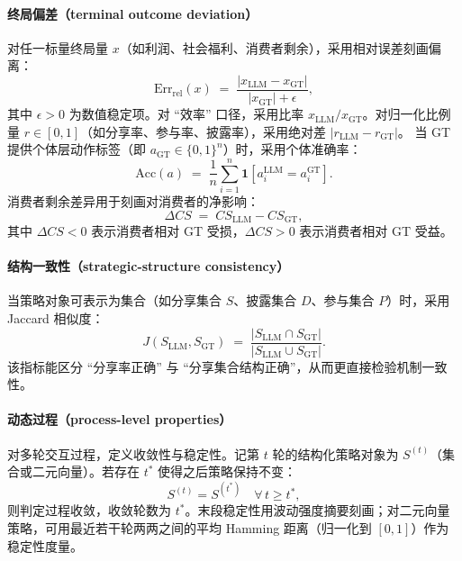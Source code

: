 \paragraph{终局偏差（terminal outcome deviation）}
对任一标量终局量 $x$（如利润、社会福利、消费者剩余），采用相对误差刻画偏离：
\begin{equation}
\mathrm{Err}_{\mathrm{rel}}(x) \;=\; \frac{\left|x_{\text{LLM}} - x_{\text{GT}}\right|}{\left|x_{\text{GT}}\right| + \epsilon},
\end{equation}
其中 $\epsilon>0$ 为数值稳定项。对 ``效率'' 口径，采用比率 $x_{\text{LLM}}/x_{\text{GT}}$。对归一化比例量 $r \in [0,1]$（如分享率、参与率、披露率），采用绝对差 $\left|r_{\text{LLM}}-r_{\text{GT}}\right|$。
当 GT 提供个体层动作标签（即 $a_{\text{GT}} \in \{0,1\}^{n}$）时，采用个体准确率：
\begin{equation}
\mathrm{Acc}(a) \;=\; \frac{1}{n}\sum_{i=1}^{n} \mathbf{1}\!\left[a^{\text{LLM}}_i = a^{\text{GT}}_i\right].
\end{equation}
消费者剩余差异用于刻画对消费者的净影响：
\begin{equation}
\Delta CS \;=\; CS_{\text{LLM}} - CS_{\text{GT}},
\end{equation}
其中 $\Delta CS < 0$ 表示消费者相对 GT 受损，$\Delta CS > 0$ 表示消费者相对 GT 受益。

\paragraph{结构一致性（strategic-structure consistency）}
当策略对象可表示为集合（如分享集合 $S$、披露集合 $D$、参与集合 $P$）时，采用 Jaccard 相似度：
\begin{equation}
J(S_{\text{LLM}}, S_{\text{GT}}) \;=\;
\frac{\left|S_{\text{LLM}}\cap S_{\text{GT}}\right|}{\left|S_{\text{LLM}}\cup S_{\text{GT}}\right|}.
\end{equation}
该指标能区分 ``分享率正确'' 与 ``分享集合结构正确''，从而更直接检验机制一致性。

\paragraph{动态过程（process-level properties）}
对多轮交互过程，定义收敛性与稳定性。记第 $t$ 轮的结构化策略对象为 $S^{(t)}$（集合或二元向量）。若存在 $t^\ast$ 使得之后策略保持不变：
\begin{equation}
S^{(t)} = S^{(t^\ast)}\quad \forall\, t \ge t^\ast,
\end{equation}
则判定过程收敛，收敛轮数为 $t^\ast$。末段稳定性用波动强度摘要刻画；对二元向量策略，可用最近若干轮两两之间的平均 Hamming 距离（归一化到 $[0,1]$）作为稳定性度量。